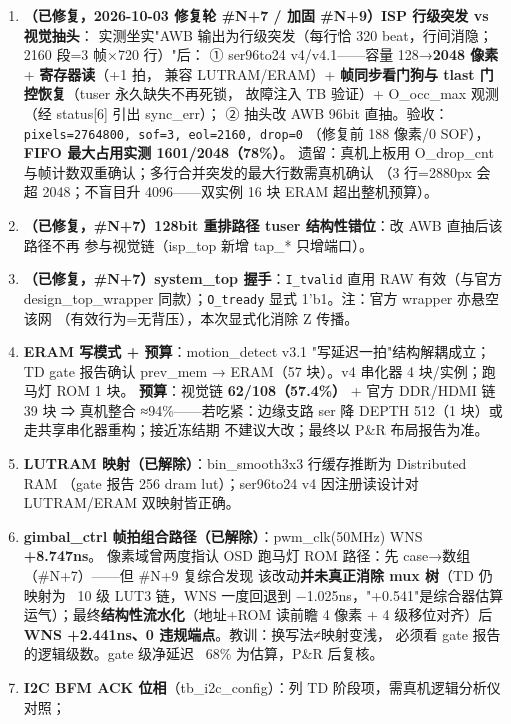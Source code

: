 \documentclass[10pt]{ctexart}
\newcommand{\code}[1]{\texttt{#1}}
\begin{document}
\begin{enumerate}
  \item \textbf{（已修复，2026-10-03 修复轮 \#N+7 / 加固 \#N+9）ISP 行级突发 vs 视觉抽头}：
        实测坐实"AWB 输出为行级突发（每行恰 320 beat，行间消隐；2160 段=3 帧×720 行）"后：
        ① ser96to24 v4/v4.1——容量 128→\textbf{2048 像素} + \textbf{寄存器读}（+1 拍，
        兼容 LUTRAM/ERAM）+ \textbf{帧同步看门狗与 tlast 门控恢复}（tuser 永久缺失不再死锁，
        故障注入 TB 验证）+ O\_occ\_max 观测（经 status[6] 引出 sync\_err）；
        ② 抽头改 AWB 96bit 直抽。验收：\code{pixels=2764800, sof=3, eol=2160, drop=0}
        （修复前 188 像素/0 SOF），\textbf{FIFO 最大占用实测 1601/2048（78\%）}。
        遗留：真机上板用 O\_drop\_cnt 与帧计数双重确认；多行合并突发的最大行数需真机确认
        （3 行=2880px 会超 2048；不盲目升 4096——双实例 16 块 ERAM 超出整机预算）。
  \item \textbf{（已修复，\#N+7）128bit 重排路径 tuser 结构性错位}：改 AWB 直抽后该路径不再
        参与视觉链（isp\_top 新增 tap\_* 只增端口）。
  \item \textbf{（已修复，\#N+7）system\_top 握手}：\code{I\_tvalid} 直用 RAW 有效（与官方
        design\_top\_wrapper 同款）；\code{O\_tready} 显式 1'b1。注：官方 wrapper 亦悬空该网
        （有效行为=无背压），本次显式化消除 Z 传播。
  \item \textbf{ERAM 写模式 + 预算}：motion\_detect v3.1 "写延迟一拍"结构解耦成立；
        TD gate 报告确认 prev\_mem → ERAM（57 块）。v4 串化器 4 块/实例；跑马灯 ROM 1 块。
        \textbf{预算}：视觉链 \textbf{62/108（57.4\%）} + 官方 DDR/HDMI 链 39 块 ⇒ 真机整合
        ≈94\%——若吃紧：边缘支路 ser 降 DEPTH 512（1 块）或走共享串化器重构；接近冻结期
        不建议大改；最终以 P\&R 布局报告为准。
  \item \textbf{LUTRAM 映射（已解除）}：bin\_smooth3x3 行缓存推断为 Distributed RAM
        （gate 报告 256 dram lut）；ser96to24 v4 因注册读设计对 LUTRAM/ERAM 双映射皆正确。
  \item \textbf{gimbal\_ctrl 帧拍组合路径（已解除）}：pwm\_clk(50MHz) WNS \textbf{+8.747ns}。
        像素域曾两度指认 OSD 跑马灯 ROM 路径：先 case→数组（\#N+7）——但 \#N+9 复综合发现
        该改动\textbf{并未真正消除 mux 树}（TD 仍映射为 ~10 级 LUT3 链，WNS 一度回退到
        −1.025ns，"+0.541"是综合器估算运气）；最终\textbf{结构性流水化}（地址+ROM 读前瞻
        4 像素 + 4 级移位对齐）后 \textbf{WNS +2.441ns、0 违规端点}。教训：换写法≠映射变浅，
        必须看 gate 报告的逻辑级数。gate 级净延迟 ~68\% 为估算，P\&R 后复核。
  \item \textbf{I2C BFM ACK 位相}（tb\_i2c\_config）：列 TD 阶段项，需真机逻辑分析仪对照；

\end{enumerate}
\end{document}
